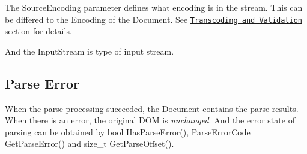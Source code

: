 The {\ttfamily Source\+Encoding} parameter defines what encoding is in the stream. This can be differed to the {\ttfamily Encoding} of the {\ttfamily Document}. See \href{#TranscodingAndValidation}{\tt Transcoding and Validation} section for details.

And the {\ttfamily Input\+Stream} is type of input stream.\hypertarget{md_Commun_Externe_RapidJSON_doc_dom.zh-cn_ParseError}{}\subsection{Parse Error}\label{md_Commun_Externe_RapidJSON_doc_dom.zh-cn_ParseError}
When the parse processing succeeded, the {\ttfamily Document} contains the parse results. When there is an error, the original D\+OM is {\itshape unchanged}. And the error state of parsing can be obtained by {\ttfamily bool Has\+Parse\+Error()}, {\ttfamily Parse\+Error\+Code Get\+Parse\+Error()} and {\ttfamily size\+\_\+t Get\+Parse\+Offset()}.

